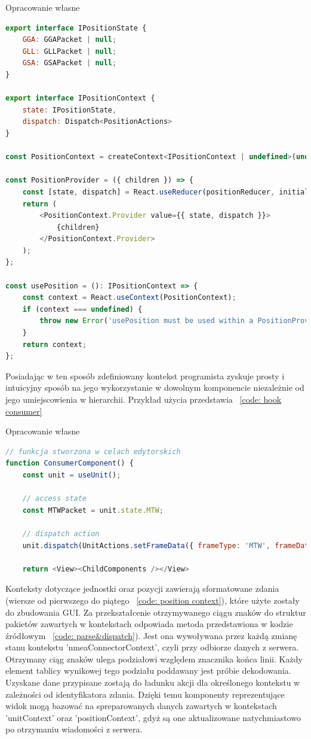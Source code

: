 \documentclass[skorowidz,skroty]{dyplomWEZUT}
\begin{document}
{Opracowanie własne}{\label{code: position context}}
\begin{lstlisting}[language=JavaScript]
export interface IPositionState {
    GGA: GGAPacket | null;
    GLL: GLLPacket | null;
    GSA: GSAPacket | null;
}

export interface IPositionContext {
    state: IPositionState,
    dispatch: Dispatch<PositionActions>
}

const PositionContext = createContext<IPositionContext | undefined>(undefined);

const PositionProvider = ({ children }) => {
    const [state, dispatch] = React.useReducer(positionReducer, initialState);
    return (
        <PositionContext.Provider value={{ state, dispatch }}>
            {children}
        </PositionContext.Provider>
    );
};

const usePosition = (): IPositionContext => {
    const context = React.useContext(PositionContext);
    if (context === undefined) {
        throw new Error('usePosition must be used within a PositionProvider');
    }
    return context;
};
\end{lstlisting}

Posiadając w ten sposób zdefiniowany kontekst programista zyskuje prosty i intuicyjny sposób na jego wykorzystanie w dowolnym komponencie niezależnie od jego umiejscowienia w hierarchii. Przykład użycia przedstawia ~\ref{code: hook consumer}

{Opracowanie własne}{\label{code: hook consumer}}
\begin{lstlisting}[language=JavaScript]
// funkcja stworzona w celach edytorskich
function ConsumerComponent() {
    const unit = useUnit();
    
    // access state
    const MTWPacket = unit.state.MTW;
    
    // dispatch action
    unit.dispatch(UnitActions.setFrameData({ frameType: 'MTW', frameData: data })
    
    return <View><ChildComponents /></View>

\end{lstlisting}

Konteksty dotyczące jednostki oraz pozycji zawierają sformatowane zdania (wiersze od pierwszego do piątego ~\ref{code: position context}), które użyte zostały do zbudowania GUI. Za przekształcenie otrzymywanego ciągu znaków do struktur pakietów zawartych w kontekstach odpowiada metoda przedstawiona w kodzie źródłowym ~\ref{code: parse&dispatch}). Jest ona wywoływana przez każdą zmianę stanu kontekstu 'nmeaConnectorContext', czyli przy odbiorze danych z serwera. Otrzymany ciąg znaków ulega podziałowi względem znacznika końca linii. Każdy element tablicy wynikowej tego podziału poddawany jest próbie dekodowania. Uzyskane dane przypisane zostają do ładunku akcji dla określonego kontekstu w zależności od identyfikatora zdania. Dzięki temu komponenty reprezentujące widok mogą bazować na spreparowanych danych zawartych w kontekstach 'unitContext' oraz 'positionContext', gdyż są one aktualizowane natychmiastowo po otrzymaniu wiadomości z serwera.
\end{document}
